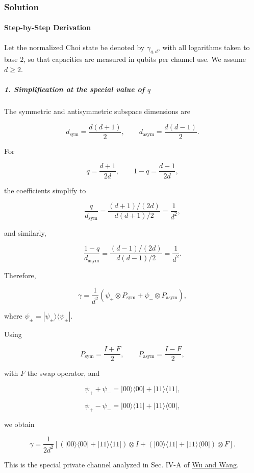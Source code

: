\subsubsection*{Solution}
\paragraph*{Step-by-Step Derivation}

Let the normalized Choi state be denoted by $\gamma_{q,d}$, with all logarithms taken to base $2$, so that capacities are measured in qubits per channel use. We assume $d\geq 2$.

\subparagraph*{1. Simplification at the special value of $q$}

The symmetric and antisymmetric subspace dimensions are

\[
d_{\mathrm{sym}}=\frac{d(d+1)}{2}, \qquad d_{\mathrm{asym}}=\frac{d(d-1)}{2}.
\]

For

\[
q=\frac{d+1}{2d}, \qquad 1-q=\frac{d-1}{2d},
\]

the coefficients simplify to

\[
\frac{q}{d_{\mathrm{sym}}} = \frac{(d+1)/(2d)}{d(d+1)/2} = \frac{1}{d^2},
\]

and similarly,

\[
\frac{1-q}{d_{\mathrm{asym}}} = \frac{(d-1)/(2d)}{d(d-1)/2} = \frac{1}{d^2}.
\]

Therefore,

\[
\gamma = \frac{1}{d^2} \left( \psi_+\otimes P_{\mathrm{sym}} + \psi_-\otimes P_{\mathrm{asym}} \right),
\]

where $\psi_\pm=|\psi_\pm\rangle\langle\psi_\pm|$.

Using

\[
P_{\mathrm{sym}}=\frac{I+F}{2}, \qquad P_{\mathrm{asym}}=\frac{I-F}{2},
\]

with $F$ the swap operator, and

\[
\psi_++\psi_- = |00\rangle\langle00|+|11\rangle\langle11|,
\]

\[
\psi_+-\psi_- = |00\rangle\langle11|+|11\rangle\langle00|,
\]

we obtain

\[
\gamma = \frac{1}{2d^2} \left[ \left( |00\rangle\langle00|+|11\rangle\langle11| \right)\otimes I + \left( |00\rangle\langle11|+|11\rangle\langle00| \right)\otimes F \right].
\]

This is the special private channel analyzed in Sec. IV-A of \href{\detokenize{https://arxiv.org/html/2510.04527v2}}{Wu and Wang}.

